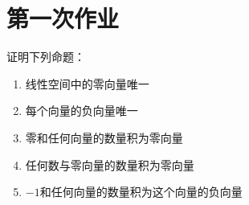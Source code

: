 \chapter{第一次作业}

\begin{homework}
    证明下列命题：
    \begin{enumerate}
        \item 线性空间中的零向量唯一
        \item 每个向量的负向量唯一
        \item 零和任何向量的数量积为零向量
        \item 任何数与零向量的数量积为零向量
        \item $-1$和任何向量的数量积为这个向量的负向量
    \end{enumerate}
\end{homework}

